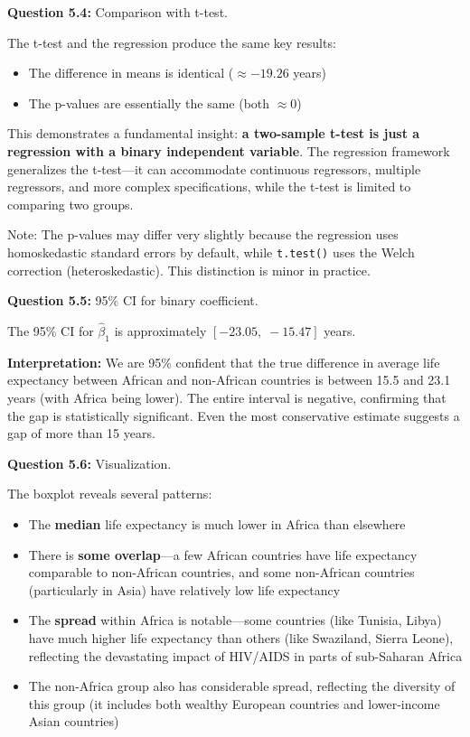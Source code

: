 \documentclass[11pt,letterpaper]{article}
\begin{document}
\textbf{Question 5.4:} Comparison with t-test.

\begin{answer}
The t-test and the regression produce the same key results:
\begin{itemize}[noitemsep]
\item The difference in means is identical ($\approx -19.26$ years)
\item The p-values are essentially the same (both $\approx 0$)
\end{itemize}

This demonstrates a fundamental insight: \textbf{a two-sample t-test is just a regression with a binary independent variable}. The regression framework generalizes the t-test---it can accommodate continuous regressors, multiple regressors, and more complex specifications, while the t-test is limited to comparing two groups.

Note: The p-values may differ very slightly because the regression uses homoskedastic standard errors by default, while \texttt{t.test()} uses the Welch correction (heteroskedastic). This distinction is minor in practice.
\end{answer}

\textbf{Question 5.5:} 95\% CI for binary coefficient.

\begin{answer}
The 95\% CI for $\hat{\beta}_1$ is approximately $[-23.05,\; -15.47]$ years.

\textbf{Interpretation:} We are 95\% confident that the true difference in average life expectancy between African and non-African countries is between 15.5 and 23.1 years (with Africa being lower). The entire interval is negative, confirming that the gap is statistically significant. Even the most conservative estimate suggests a gap of more than 15 years.
\end{answer}

\textbf{Question 5.6:} Visualization.

\begin{answer}
The boxplot reveals several patterns:
\begin{itemize}[noitemsep]
\item The \textbf{median} life expectancy is much lower in Africa than elsewhere
\item There is \textbf{some overlap}---a few African countries have life expectancy comparable to non-African countries, and some non-African countries (particularly in Asia) have relatively low life expectancy
\item The \textbf{spread} within Africa is notable---some countries (like Tunisia, Libya) have much higher life expectancy than others (like Swaziland, Sierra Leone), reflecting the devastating impact of HIV/AIDS in parts of sub-Saharan Africa
\item The non-Africa group also has considerable spread, reflecting the diversity of this group (it includes both wealthy European countries and lower-income Asian countries)
\end{itemize}
\end{answer}
\end{document}
